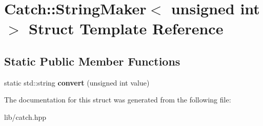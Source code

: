 \hypertarget{struct_catch_1_1_string_maker_3_01unsigned_01int_01_4}{}\section{Catch\+:\+:String\+Maker$<$ unsigned int $>$ Struct Template Reference}
\label{struct_catch_1_1_string_maker_3_01unsigned_01int_01_4}
\subsection*{Static Public Member Functions}
\begin{DoxyCompactItemize}
\item 
\mbox{\label{struct_catch_1_1_string_maker_3_01unsigned_01int_01_4_aa0ec816ef8a65664b0524d55d08e2fd9}} 
static std\+::string {\bfseries convert} (unsigned int value)
\end{DoxyCompactItemize}


The documentation for this struct was generated from the following file\+:\begin{DoxyCompactItemize}
\item 
lib/catch.\+hpp\end{DoxyCompactItemize}

